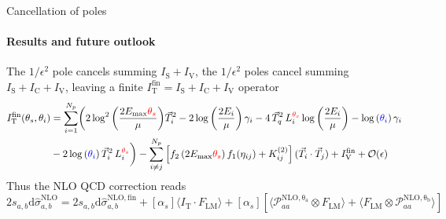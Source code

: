 \begin{frame} {Cancellation of poles}
  \framesubtitle{Results and future outlook}
The $1/\epsilon^2$ pole cancels summing $I_{\mathrm{S}}+I_{\mathrm{V}}$, the $1/\epsilon^2$ poles cancel summing $I_{\mathrm{S}}+I_{\mathrm{C}}+I_{\mathrm{V}}$, leaving a finite $I_{\mathrm{T}}^{\mathrm{fin}}=I_{\mathrm{S}}+I_{\mathrm{C}}+I_{\mathrm{V}}$ operator
 \begin{equation*}
 \begin{aligned}
     I_{\mathrm{T}}^{\mathrm{fin}}(\theta_s,\theta_i) & = \sum_{i=1}^{N_p} \biggl(2 \log^2{\left(\frac{2 E_{\mathrm{max}}\textcolor{red}{\theta_s}}{\mu} \right)}\vec{T}_i^2  - 2 \log{\left(\frac{2E_i}{\mu}\right)}\, \gamma_i - 4 \, \vec{T}_q^2 \, L_i^{\textcolor{red}{\theta_s}} \log{\left(\frac{2E_i}{\mu}\right)} - \log{(\textcolor{blue}{\theta_i})} \, \gamma_i \\
     & - 2 \log{(\textcolor{blue}{\theta_i})} \, \vec{T}_i^2 \, L_i^{\textcolor{red}{\theta_s}} \biggr) - \sum_{i\neq j}^{N_p} \left[ f_2 \left(2 E_{\mathrm{max}}\textcolor{red}{\theta_s}\right) f_1(\eta_{ij}) + K_{ij}^{(2)}\right] (\vec{T}_i \cdot \vec{T}_j) + I_{\mathrm{V}}^{\mathrm{fin}} +\mathcal{O}(\epsilon)
 \end{aligned}
 \end{equation*}
Thus the NLO QCD correction reads
\begin{equation*}
    2s_{a,b} \mathrm{d}\hat{\sigma}_{a,b}^{\mathrm{NLO}} = 2s_{a,b} \mathrm{d}\hat{\sigma}_{a,b}^{\mathrm{NLO, fin}} + [\alpha_s] \langle I_{\mathrm{T}}\cdot F_{\mathrm{LM}} \rangle + [\alpha_s]\left[\langle \mathcal{P}_{aa}^{\mathrm{NLO, \theta_a}}\otimes F_{\mathrm{LM}}\rangle+\langle F_{\mathrm{LM}}\otimes \mathcal{P}_{aa}^{\mathrm{NLO, \theta_b}}\rangle \right]
\end{equation*}

\end{frame}



